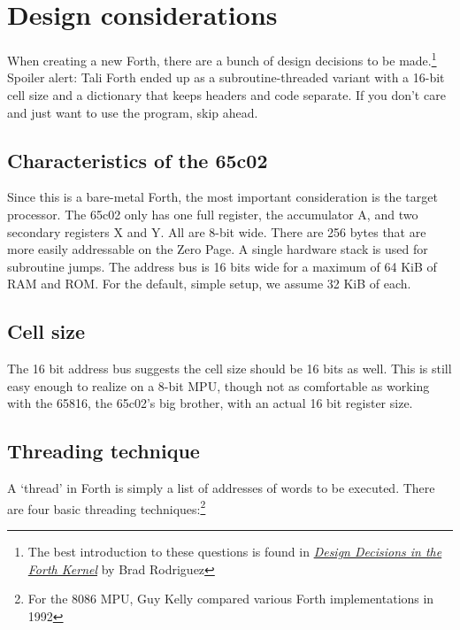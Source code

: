 
\section{Design considerations}

When creating a new Forth, there are a bunch of design decisions to be
made.\footnote{The best introduction to these questions is found in
\href{http://www.bradrodriguez.com/papers/moving1.htm}{\textit{Design Decisions
in the Forth Kernel}} by Brad Rodriguez} Spoiler alert:
Tali Forth ended up as a subroutine-threaded variant with a 16-bit cell size and
a dictionary that keeps headers and code separate. If you don't care and just
want to use the program, skip ahead. 

\subsection{Characteristics of the 65c02}

Since this is a bare-metal Forth, the most important consideration is the target
processor. The 65c02 only has one full register, the accumulator
A, and two secondary registers X and
Y. All are 8-bit wide. There are 256 bytes that are more
easily addressable on the Zero Page. A single hardware stack is
used for subroutine jumps. The address bus is 16 bits wide
for a maximum of 64 KiB of RAM and ROM. For the default,
simple setup, we assume 32 KiB of each. 

\subsection{Cell size}

The 16 bit address bus suggests the cell size should be 16
bits as well. This is still easy enough to realize on a 8-bit MPU, though not as
comfortable as working with the 65816, the 65c02's big brother,
with an actual 16 bit register size.

\subsection{Threading technique}

A `thread' in Forth is simply a list of addresses of words to be executed. 
There are four basic threading techniques:\footnote{For the 8086 MPU, Guy
Kelly compared various Forth implementations in
1992\cite{kelly92}}

